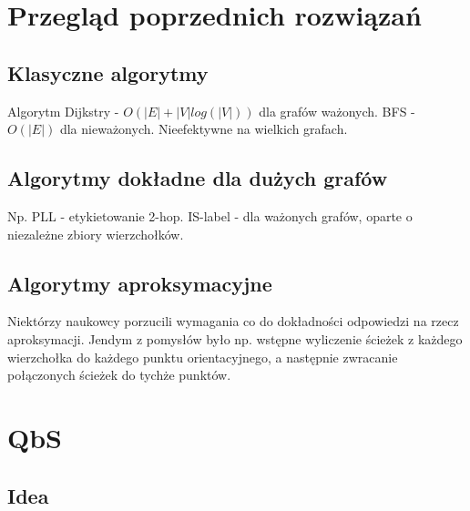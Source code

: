 \documentclass{article}
\theoremstyle{definition}
\begin{document}
    \section{Przegląd poprzednich rozwiązań}
        
        \subsection{Klasyczne algorytmy}
            Algorytm Dijkstry - $O(|E| + |V|log(|V|))$ dla grafów ważonych. BFS - $O(|E|)$ dla nieważonych. Nieefektywne na wielkich grafach.
        \subsection{Algorytmy dokładne dla dużych grafów}
            Np. PLL - etykietowanie 2-hop. IS-label - dla ważonych grafów, oparte o niezależne zbiory wierzchołków.

        \subsection{Algorytmy aproksymacyjne}
            Niektórzy naukowcy porzucili wymagania co do dokładności odpowiedzi na rzecz aproksymacji. Jendym z pomysłów było np. wstępne wyliczenie ścieżek z każdego wierzchołka do każdego punktu orientacyjnego, a następnie zwracanie połączonych ścieżek do tychże punktów. 
            
    \section{QbS}
    
    \subsection{Idea}
\end{document}
